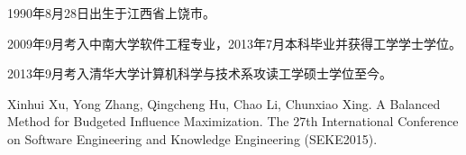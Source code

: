 \begin{resume}


  1990年8月28日出生于江西省上饶市。
  
  2009年9月考入中南大学软件工程专业，2013年7月本科毕业并获得工学学士学位。
  
  2013年9月考入清华大学计算机科学与技术系攻读工学硕士学位至今。


  \begin{enumerate}[{[}1{]}]
  \item Xinhui Xu, Yong Zhang, Qingcheng Hu, Chao Li, Chunxiao Xing. A Balanced Method for Budgeted Influence Maximization. The 27th International Conference on Software Engineering and Knowledge Engineering (SEKE2015).
  
  \end{enumerate}
 
  

\end{resume}
